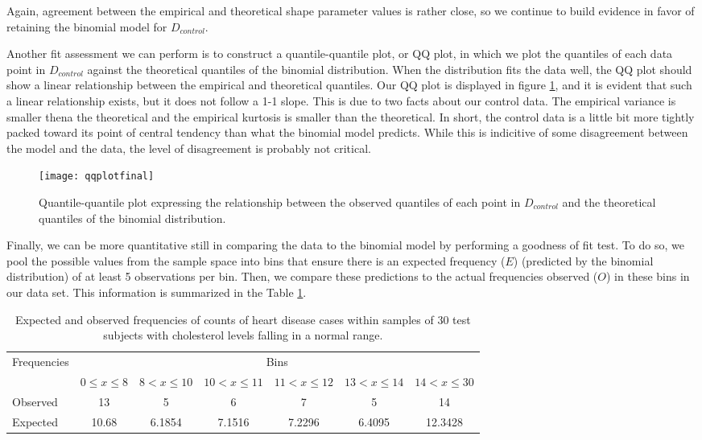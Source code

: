 \documentclass{amsart}
\begin{document}
Again, agreement between the empirical and theoretical shape parameter values is rather close, so we continue to build evidence in favor of retaining the binomial model for $D_{control}$.

Another fit assessment we can perform is to construct a quantile-quantile plot, or QQ plot, in which we plot the quantiles of each data point in $D_{control}$ against the theoretical quantiles of the binomial distribution. When the distribution fits the data well, the QQ plot should show a linear relationship between the empirical and theoretical quantiles. Our QQ plot is displayed in figure \ref{F:qqplot}, and it is evident that such a linear relationship exists, but it does not follow a 1-1 slope. This is due to two facts about our control data. The empirical variance is smaller thena the theoretical and the empirical kurtosis is smaller than the theoretical. In short, the control data is a little bit more tightly packed toward its point of central tendency than what the binomial model predicts. While this is indicitive of some disagreement between the model and the data, the level of disagreement is probably not critical.
\begin{figure}
\centering
\texttt{[image: qqplotfinal]}
\caption{
Quantile-quantile plot expressing the relationship between the observed quantiles of each point in $D_{control}$ and the theoretical quantiles of the binomial distribution.\label{F:qqplot}}
\end{figure}

Finally, we can be more quantitative still in comparing the data to the binomial model by performing a goodness of fit test.  To do so, we pool the possible values from the sample space into bins that ensure there is an expected frequency ($E$) (predicted by the binomial distribution) of at least 5 observations per bin.  Then, we compare these predictions to the actual frequencies observed ($O$) in these bins in our data set.  This information is summarized in the Table \ref{Tbl:chi2}.

\begin{table}
{\footnotesize
\begin{tabular}{lcccccc}
\toprule
\multirow{2}{*}{Frequencies} & \multicolumn{6}{c}{Bins}\\	
	& $0\le x\le 8$ &	$8<x\le 10$ & 	$10<x\le 11$ & $11<x\le 12$ & $13<x\le 14$ &$14<x\le 30$\\
	\midrule
Observed& 13& 5& 6 & 7 & 5 & 14\\
Expected & 10.68 & 6.1854 & 7.1516 & 7.2296 & 6.4095 & 12.3428\\
\bottomrule
\end{tabular}}
\caption{Expected and observed frequencies of counts of heart disease cases within samples of 30 test subjects with cholesterol levels falling in a normal range.\label{Tbl:chi2}}
\end{table}
\end{document}

